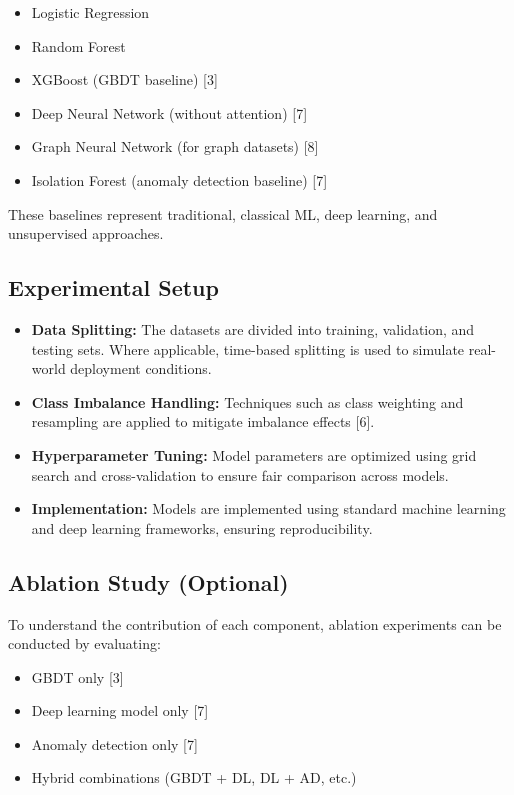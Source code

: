 \documentclass[conference]{IEEEtran}
\begin{document}
\begin{itemize}
    \item Logistic Regression
    \item Random Forest
    \item XGBoost (GBDT baseline) [3]
    \item Deep Neural Network (without attention) [7]
    \item Graph Neural Network (for graph datasets) [8]
    \item Isolation Forest (anomaly detection baseline) [7]
\end{itemize}

These baselines represent traditional, classical ML, deep learning, and unsupervised approaches.

\subsection{Experimental Setup}

\begin{itemize}
    \item \textbf{Data Splitting:}  
    The datasets are divided into training, validation, and testing sets. Where applicable, time-based splitting is used to simulate real-world deployment conditions.

    \item \textbf{Class Imbalance Handling:}  
    Techniques such as class weighting and resampling are applied to mitigate imbalance effects [6].

    \item \textbf{Hyperparameter Tuning:}  
    Model parameters are optimized using grid search and cross-validation to ensure fair comparison across models.

    \item \textbf{Implementation:}  
    Models are implemented using standard machine learning and deep learning frameworks, ensuring reproducibility.
\end{itemize}

\subsection{Ablation Study (Optional)}

To understand the contribution of each component, ablation experiments can be conducted by evaluating:

\begin{itemize}
    \item GBDT only [3]
    \item Deep learning model only [7]
    \item Anomaly detection only [7]
    \item Hybrid combinations (GBDT + DL, DL + AD, etc.)
\end{itemize}
\end{document}
